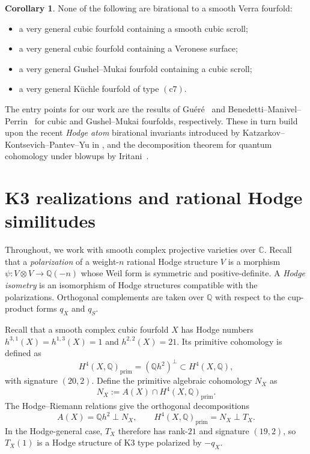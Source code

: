 \documentclass[10pt]{amsart}
\numberwithin{equation}{section}
\theoremstyle{definition}
\newtheorem{corollary}[theorem]{Corollary}
\theoremstyle{plain}
\numberwithin{theorem}{section}
\newcommand{\Q}{\mathbb{Q}}
\newcommand{\C}{\mathbb{C}}
\begin{document}
\begin{corollary}\label{cor:verra-examples}
None of the following are birational to a smooth Verra fourfold:
\begin{itemize}
    \item a very general cubic fourfold containing a smooth cubic scroll;
    \item a very general cubic fourfold containing a Veronese surface;
    \item a very general Gushel--Mukai fourfold containing a cubic scroll;
    \item a very general K\"uchle fourfold of type $(\mathrm{c7})$.
\end{itemize}
\end{corollary}
The entry points for our work are the results of Gu\'er\'e~\cite[Theorem~56]{guere} and Benedetti--Manivel--Perrin~\cite[Theorem~13]{benedetti2026quantumcohomologyirrationalitygushelmukai} for cubic and Gushel--Mukai fourfolds, respectively. These in turn build upon the recent \emph{Hodge atom} birational invariants introduced by Katzarkov--Kontsevich--Pantev--Yu in \citep{KKPY}, and the decomposition theorem for quantum cohomology under blowups by Iritani~\citep{iritani2023quantum, iritani2026notesdecompositiontheoremblowups}.


\section{K3 realizations and rational Hodge similitudes}
\label{sec:iso}
Throughout, we work with smooth complex projective varieties over $\C$. Recall that a \emph{polarization} of a weight-$n$ rational Hodge structure $V$ is a morphism $\psi\colon V \otimes V \to \Q(-n)$ whose Weil form is symmetric and positive-definite. A \emph{Hodge isometry} is an isomorphism of Hodge structures compatible with the polarizations. Orthogonal complements are taken over $\Q$ with respect to the cup-product forms $q_X$ and $q_S$. 

Recall that a smooth complex cubic fourfold $X$ has Hodge numbers $h^{3,1}(X)=h^{1,3}(X)=1$ and $h^{2,2}(X)=21$. Its
primitive cohomology is defined as
\[
H^4(X,\Q)_{\text{prim}}=(\Q h^2)^\perp\subset H^4(X,\Q),
\]
with signature $(20,2)$. Define the primitive algebraic cohomology $N_X$ as 
\[
N_X:=A(X)\cap H^4(X,\Q)_{\text{prim}}.
\] 
The Hodge--Riemann relations give the orthogonal decompositions 
\begin{equation}\label{eq:decompositions}
A(X) =\Q h^2\perp N_X,
\qquad
H^4(X,\Q)_{\text{prim}} =N_X\perp T_X.
\end{equation}
In the Hodge-general case, $T_X$ therefore has rank-$21$ and signature $(19,2)$, so $T_X(1)$ is a Hodge structure of K3 type polarized by $-q_X$.  
\end{document}
